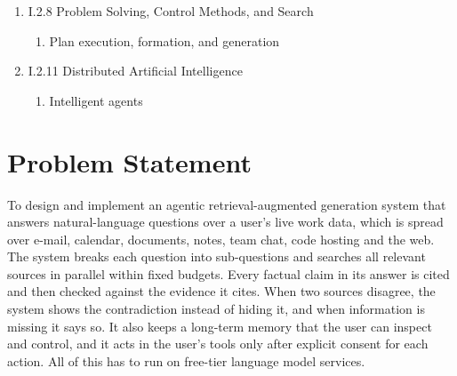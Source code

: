 \documentclass[oneside,a4paper,12pt]{report}
\begin{document}
\begin{enumerate}
\begin{enumerate}
\begin{enumerate}
\begin{enumerate}
			\end{enumerate}
			\item I.2.8 Problem Solving, Control Methods, and Search
			\begin{enumerate}
				\item Plan execution, formation, and generation
			\end{enumerate}
			\item I.2.11 Distributed Artificial Intelligence
			\begin{enumerate}
				\item Intelligent agents
			\end{enumerate}
		\end{enumerate}
	\end{enumerate}
\end{enumerate}



\section{Problem Statement}
\label{sec:problem}
To design and implement an agentic retrieval-augmented generation system that answers natural-language questions over a user's live work data, which is spread over e-mail, calendar, documents, notes, team chat, code hosting and the web. The system breaks each question into sub-questions and searches all relevant sources in parallel within fixed budgets. Every factual claim in its answer is cited and then checked against the evidence it cites. When two sources disagree, the system shows the contradiction instead of hiding it, and when information is missing it says so. It also keeps a long-term memory that the user can inspect and control, and it acts in the user's tools only after explicit consent for each action. All of this has to run on free-tier language model services.
\end{document}
